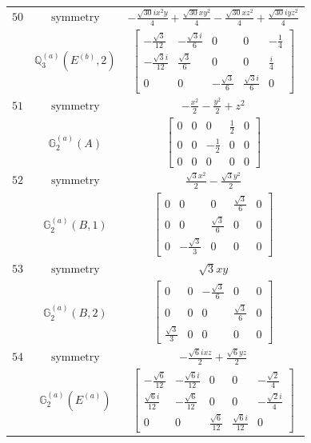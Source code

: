 \documentclass[fleqn,8pt,landscape]{jsarticle}
\begin{document}
\begin{longtable}{ccc}
$ 50 $ & $ \text{symmetry} $ & $ - \frac{\sqrt{30} i x^{2} y}{4} + \frac{\sqrt{30} x y^{2}}{4} - \frac{\sqrt{30} x z^{2}}{4} + \frac{\sqrt{30} i y z^{2}}{4} $ \\
$  $ & $ \mathbb{Q}_{3}^{(a)}(E^{(b)},2) $ & $ \begin{bmatrix} - \frac{\sqrt{3}}{12} & - \frac{\sqrt{3} i}{6} & 0 & 0 & - \frac{1}{4} \\ - \frac{\sqrt{3} i}{12} & \frac{\sqrt{3}}{6} & 0 & 0 & \frac{i}{4} \\ 0 & 0 & - \frac{\sqrt{3}}{6} & \frac{\sqrt{3} i}{6} & 0 \end{bmatrix} $ \\ \hline
$ 51 $ & $ \text{symmetry} $ & $ - \frac{x^{2}}{2} - \frac{y^{2}}{2} + z^{2} $ \\
$  $ & $ \mathbb{G}_{2}^{(a)}(A) $ & $ \begin{bmatrix} 0 & 0 & 0 & \frac{1}{2} & 0 \\ 0 & 0 & - \frac{1}{2} & 0 & 0 \\ 0 & 0 & 0 & 0 & 0 \end{bmatrix} $ \\ \hline
$ 52 $ & $ \text{symmetry} $ & $ \frac{\sqrt{3} x^{2}}{2} - \frac{\sqrt{3} y^{2}}{2} $ \\
$  $ & $ \mathbb{G}_{2}^{(a)}(B,1) $ & $ \begin{bmatrix} 0 & 0 & 0 & \frac{\sqrt{3}}{6} & 0 \\ 0 & 0 & \frac{\sqrt{3}}{6} & 0 & 0 \\ 0 & - \frac{\sqrt{3}}{3} & 0 & 0 & 0 \end{bmatrix} $ \\ \hline
$ 53 $ & $ \text{symmetry} $ & $ \sqrt{3} x y $ \\
$  $ & $ \mathbb{G}_{2}^{(a)}(B,2) $ & $ \begin{bmatrix} 0 & 0 & - \frac{\sqrt{3}}{6} & 0 & 0 \\ 0 & 0 & 0 & \frac{\sqrt{3}}{6} & 0 \\ \frac{\sqrt{3}}{3} & 0 & 0 & 0 & 0 \end{bmatrix} $ \\ \hline
$ 54 $ & $ \text{symmetry} $ & $ - \frac{\sqrt{6} i x z}{2} + \frac{\sqrt{6} y z}{2} $ \\
$  $ & $ \mathbb{G}_{2}^{(a)}(E^{(a)}) $ & $ \begin{bmatrix} - \frac{\sqrt{6}}{12} & - \frac{\sqrt{6} i}{12} & 0 & 0 & - \frac{\sqrt{2}}{4} \\ \frac{\sqrt{6} i}{12} & - \frac{\sqrt{6}}{12} & 0 & 0 & - \frac{\sqrt{2} i}{4} \\ 0 & 0 & \frac{\sqrt{6}}{12} & \frac{\sqrt{6} i}{12} & 0 \end{bmatrix} $ \\ \hline

\end{longtable}
\end{document}
